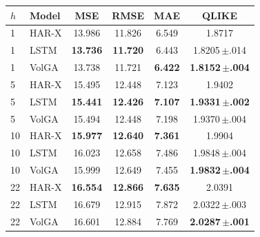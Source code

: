 \begin{tabular}{llcccc}
\toprule
$h$ & Model & MSE & RMSE & MAE & QLIKE \\
\midrule
1 & HAR-X & 13.986 & 11.826 & 6.549 & 1.8717 \\
1 & LSTM & \textbf{13.736} & \textbf{11.720} & 6.443 & 1.8205\,$\pm$.014 \\
1 & VolGA & 13.738 & 11.721 & \textbf{6.422} & \textbf{1.8152\,$\pm$.004} \\
\midrule
5 & HAR-X & 15.495 & 12.448 & 7.123 & 1.9402 \\
5 & LSTM & \textbf{15.441} & \textbf{12.426} & \textbf{7.107} & \textbf{1.9331\,$\pm$.002} \\
5 & VolGA & 15.494 & 12.448 & 7.198 & 1.9370\,$\pm$.004 \\
\midrule
10 & HAR-X & \textbf{15.977} & \textbf{12.640} & \textbf{7.361} & 1.9904 \\
10 & LSTM & 16.023 & 12.658 & 7.486 & 1.9848\,$\pm$.004 \\
10 & VolGA & 15.999 & 12.649 & 7.455 & \textbf{1.9832\,$\pm$.004} \\
\midrule
22 & HAR-X & \textbf{16.554} & \textbf{12.866} & \textbf{7.635} & 2.0391 \\
22 & LSTM & 16.679 & 12.915 & 7.872 & 2.0322\,$\pm$.003 \\
22 & VolGA & 16.601 & 12.884 & 7.769 & \textbf{2.0287\,$\pm$.001} \\
\bottomrule
\end{tabular}
